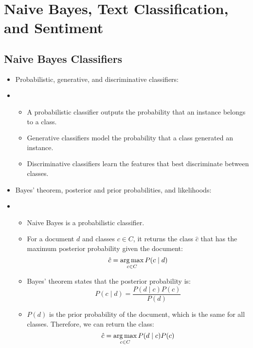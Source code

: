 \section{Naive Bayes, Text Classification, and Sentiment}

\subsection{Naive Bayes Classifiers}

\begin{itemize}
  \item Probabilistic, generative, and discriminative classifiers:
  \item[]
        \begin{itemize}
          \item A probabilistic classifier outputs the probability that an instance belongs to a class.
          \item Generative classifiers model the probability that a class generated an instance.
          \item Discriminative classifiers learn the features that best discriminate between classes.
        \end{itemize}
  \item Bayes' theorem, posterior and prior probabilities, and likelihoods:
  \item[]
        \begin{itemize}
          \item Naive Bayes is a probabilistic classifier.
          \item For a document $d$ and classes $c \in C$, it returns the class $\hat{c}$ that has the maximum posterior probability given the document:
                \begin{equation}
                  \hat{c} = \operatorname*{arg\,max}_{c \in C} P(c \mid d)
                \end{equation}
          \item Bayes' theorem states that the posterior probability is:
                \begin{equation}
                  P(c \mid d) = \frac{P(d \mid c) P(c)}{P(d)}
                \end{equation}
          \item $P(d)$ is the
                prior probability of the document, which is the same for all classes.
                Therefore, we can return the class:
                \begin{equation}
                  \hat{c} = \argmax_{c \in C} P(d \mid c) P(c)

\end{equation}
\end{itemize}
\end{itemize}

